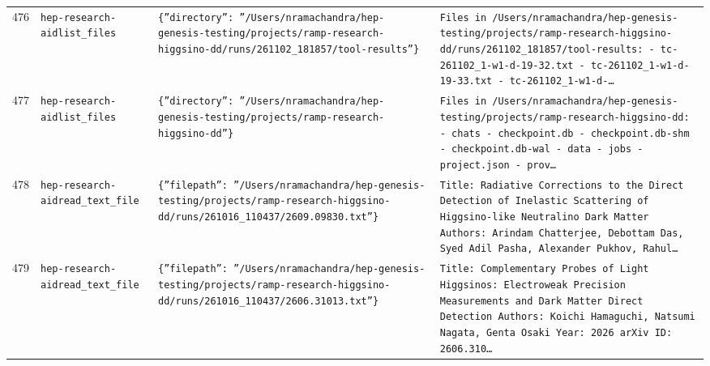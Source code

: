 \documentclass[11pt,a4paper]{article}
\begin{document}
\begin{longtable}{@{}p{}p{}p{}p{}@{}}
476 & \texttt{hep-research-aid}\newline\texttt{list\_\allowbreak{}files} & \texttt{\{''directory'':\allowbreak{} ''/\allowbreak{}Users/\allowbreak{}nramachandra/\allowbreak{}hep-genesis-testing/\allowbreak{}projects/\allowbreak{}ramp-research-higgsino-dd/\allowbreak{}runs/\allowbreak{}261102\_\allowbreak{}181857/\allowbreak{}tool-results''\}\allowbreak{}} & \texttt{Files in /\allowbreak{}Users/\allowbreak{}nramachandra/\allowbreak{}hep-genesis-testing/\allowbreak{}projects/\allowbreak{}ramp-research-higgsino-dd/\allowbreak{}runs/\allowbreak{}261102\_\allowbreak{}181857/\allowbreak{}tool-results:\allowbreak{}   - tc-261102\_\allowbreak{}1-w1-d-19-32.txt   - tc-261102\_\allowbreak{}1-w1-d-19-33.txt   - tc-261102\_\allowbreak{}1-w1-d-\ldots{}\allowbreak{}} \\
477 & \texttt{hep-research-aid}\newline\texttt{list\_\allowbreak{}files} & \texttt{\{''directory'':\allowbreak{} ''/\allowbreak{}Users/\allowbreak{}nramachandra/\allowbreak{}hep-genesis-testing/\allowbreak{}projects/\allowbreak{}ramp-research-higgsino-dd''\}\allowbreak{}} & \texttt{Files in /\allowbreak{}Users/\allowbreak{}nramachandra/\allowbreak{}hep-genesis-testing/\allowbreak{}projects/\allowbreak{}ramp-research-higgsino-dd:\allowbreak{}   - chats   - checkpoint.db   - checkpoint.db-shm   - checkpoint.db-wal   - data   - jobs   - project.json   - prov\ldots{}\allowbreak{}} \\
478 & \texttt{hep-research-aid}\newline\texttt{read\_\allowbreak{}text\_\allowbreak{}file} & \texttt{\{''filepath'':\allowbreak{} ''/\allowbreak{}Users/\allowbreak{}nramachandra/\allowbreak{}hep-genesis-testing/\allowbreak{}projects/\allowbreak{}ramp-research-higgsino-dd/\allowbreak{}runs/\allowbreak{}261016\_\allowbreak{}110437/\allowbreak{}2609.09830.txt''\}\allowbreak{}} & \texttt{Title:\allowbreak{} Radiative Corrections to the Direct Detection of Inelastic Scattering of Higgsino-like Neutralino Dark Matter Authors:\allowbreak{} Arindam Chatterjee,\allowbreak{} Debottam Das,\allowbreak{} Syed Adil Pasha,\allowbreak{} Alexander Pukhov,\allowbreak{} Rahul\ldots{}\allowbreak{}} \\
479 & \texttt{hep-research-aid}\newline\texttt{read\_\allowbreak{}text\_\allowbreak{}file} & \texttt{\{''filepath'':\allowbreak{} ''/\allowbreak{}Users/\allowbreak{}nramachandra/\allowbreak{}hep-genesis-testing/\allowbreak{}projects/\allowbreak{}ramp-research-higgsino-dd/\allowbreak{}runs/\allowbreak{}261016\_\allowbreak{}110437/\allowbreak{}2606.31013.txt''\}\allowbreak{}} & \texttt{Title:\allowbreak{} Complementary Probes of Light Higgsinos:\allowbreak{} Electroweak Precision Measurements and Dark Matter Direct Detection Authors:\allowbreak{} Koichi Hamaguchi,\allowbreak{} Natsumi Nagata,\allowbreak{} Genta Osaki Year:\allowbreak{} 2026 arXiv ID:\allowbreak{} 2606.310\ldots{}\allowbreak{}} \\

\end{longtable}
\end{document}
